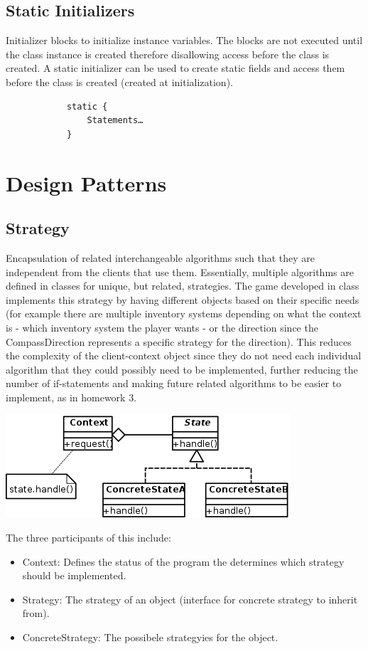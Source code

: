 \documentclass[a4paper, 11pt]{article}
\begin{document}
    \subsection{Static Initializers}
        Initializer blocks to initialize instance variables.  The blocks are not executed until the class instance is created therefore disallowing access before the class is created.  A static initializer can be used to create static fields and access them before the class is created (created at initialization).

        \begin{lstlisting}
            static {
            	Statements…
            }
        \end{lstlisting}

\newpage

\section{Design Patterns}

    \subsection{Strategy}
        Encapsulation of related interchangeable algorithms such that they are independent from the clients that use them.  Essentially, multiple algorithms are defined in classes for unique, but related, strategies.  The game developed in class implements this strategy by having different objects based on their specific needs (for example there are multiple inventory systems depending on what the context is - which inventory system the player wants - or the direction since the CompassDirection represents a specific strategy for the direction).  This reduces the complexity of the client-context object since they do not need each individual algorithm that they could possibly need to be implemented, further reducing the number of if-statements and making future related algorithms to be easier to implement, as in homework 3.
        \begin{center}
            \includegraphics[scale=0.8]{state}
        \end{center}
        The three participants of this include:
        \begin{itemize}
            \item Context: Defines the status of the program the determines which strategy should be implemented.
            \item Strategy: The strategy of an object (interface for concrete strategy to inherit from).
            \item ConcreteStrategy: The possibele strategyies for the object.
        \end{itemize}
\end{document}
